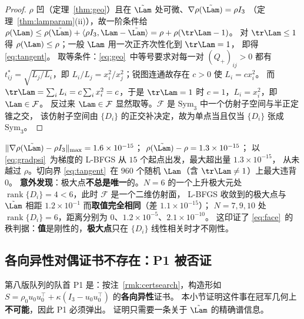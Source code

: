 \begin{proof}
$\rho$ 凹（定理~\ref{thm:geo}）且在 $\tilde\Lam$ 处可微、$\nabla\rho(\tilde\Lam)=\rho I_3$
（定理~\ref{thm:lamparam}(ii)），故一阶条件给
$\rho(\Lam)\le\rho(\tilde\Lam)+\langle\rho I_3,\Lam-\tilde\Lam\rangle=\rho+\rho(\tr\Lam-1)$。
对 $\tr\Lam\le1$ 得 $\rho(\Lam)\le\rho$；一般 $\Lam$ 用一次正齐次性化到 $\tr\Lam=1$，
即得 \eqref{eq:tangent}。
取等条件：\eqref{eq:geo}~中等号要求对每一对 $(Q_+)_{ij}>0$ 都有
$t^*_{ij}=\sqrt{L_j/L_i}$，即 $L_i/L_j=x_i^2/x_j^2$；锐图连通故存在 $c>0$ 使 $L_i=cx_i^2$。
而 $\tr\Lam=\sum_iL_i=c\sum_ix_i^2=c$，于是 $\tr\Lam=1$ 时 $c=1$，$L_i=x_i^2$，即 $\Lam\in\mathcal F$。
反过来 $\Lam\in\mathcal F$ 显然取等。$\mathcal F$ 是 $\mathrm{Sym}_3$ 中一个仿射子空间与半正定锥之交，
该仿射子空间由 $\{D_i\}$ 的正交补决定，故为单点当且仅当 $\{D_i\}$ 张成 $\mathrm{Sym}_3$。
\end{proof}

\begin{remark}\label{rmk:argmax}
$\|\nabla\rho(\tilde\Lam)-\rho I_3\|_{\max}=1.6\times10^{-15}$；
$\rho(\tilde\Lam)-\rho=1.3\times10^{-15}$；
以 \eqref{eq:gradpsi}~为梯度的 L-BFGS 从 $15$ 个起点出发，最大超出量 $1.3\times10^{-15}$，
从未越过 $\rho$。切向界 \eqref{eq:tangent}~在 $960$ 个随机 $\Lam$（含 $\tr\Lam\ne1$）上最大违背 $0$。
\textbf{意外发现}：极大点\textbf{不总是唯一}的。$N=6$ 的一个上升极大元处
$\operatorname{rank}\{D_i\}=4<6$，此时 $\mathcal F$ 是一个二维仿射面，
L-BFGS 收敛到的极大点与 $\tilde\Lam$ 相距 $1.2\times10^{-1}$ 而\textbf{取值完全相同}（差 $1.1\times10^{-15}$）；
$N=7,9,10$ 处 $\operatorname{rank}\{D_i\}=6$，距离分别为 $0$、$1.2\times10^{-5}$、$2.1\times10^{-10}$。
这印证了 \eqref{eq:face}~的秩判据：\textbf{值}是刚性的，\textbf{极大点}只在 $\{D_i\}$ 线性相关时才不刚性。
\end{remark}

\subsection{各向异性对偶证书不存在：P1 被否证}\label{sec:r19:p1dead}

第八版队列的队首 P1 是：按注~\ref{rmk:certsearch}，构造形如
$S=\rho_0u_0u_0^\top+\kappa(I_3-u_0u_0^\top)$ 的\textbf{各向异性}证书。
本小节证明这件事在冠军几何上\textbf{不可能}，因此 P1 必须弹出。
证明只需要一条关于 $\tilde\Lam$ 的精确谱信息。

